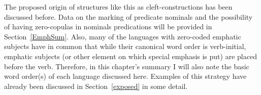 The proposed origin of structures like this as cleft-constructions has been discussed before. 
Data on the marking of predicate nominals and the possibility of having zero-copulas in nominals predications will be provided in Section~\ref{EmphSum}.
Also, many of the languages with zero-coded emphatic subjects have in common that while their canonical word order is verb-initial, emphatic subjects (or other element on which special emphasis is put) are placed before the verb. 
Therefore, in this chapter's summary I will also note the basic word order(s) of each language discussed here. 
Examples of this strategy have already been discussed in Section~\ref{exposed} in some detail.

